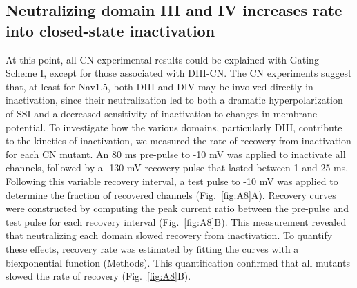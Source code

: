 \subsection{Neutralizing domain III and IV increases rate into closed-state inactivation}
At this point, all CN experimental results could be explained with Gating Scheme I, except for those associated with DIII-CN. The CN experiments suggest that, at least for Nav1.5, both DIII and DIV may be involved directly in inactivation, since their neutralization led to both a dramatic hyperpolarization of SSI and a decreased sensitivity of inactivation to changes in membrane potential. To investigate how the various domains, particularly DIII, contribute to the kinetics of inactivation, we measured the rate of recovery from inactivation for each CN mutant. An 80 ms pre-pulse to -10 mV was applied to inactivate all channels, followed by a -130 mV recovery pulse that lasted between 1 and 25 ms. Following this variable recovery interval, a test pulse to -10 mV was applied to determine the fraction of recovered channels (Fig.~\ref{fig:A8}A). Recovery curves were constructed by computing the peak current ratio between the pre-pulse and test pulse for each recovery interval (Fig.~\ref{fig:A8}B). This measurement revealed that neutralizing each domain slowed recovery from inactivation. To quantify these effects, recovery rate was estimated by fitting the curves with a biexponential function (Methods). This quantification confirmed that all mutants slowed the rate of recovery (Fig.~\ref{fig:A8}B).

